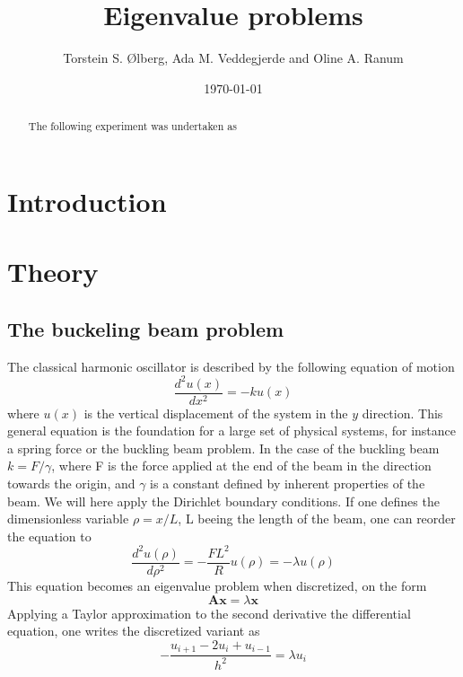 \documentclass[%
reprint,
amsmath,amssymb,
aps,
]{revtex4-1}
\begin{document}
\title{Eigenvalue problems}
\author{Torstein S. Ølberg, Ada M. Veddegjerde and Oline A. Ranum}
\date{\today}


\begin{abstract}
	The following experiment was undertaken as
\end{abstract}
\maketitle

\section*{Introduction}


\section*{Theory}


\subsection{The buckeling beam problem} \noindent 
The classical harmonic oscillator is described by the following equation of motion
\begin{equation}\label{evp}
 \frac{d^2 u(x)}{dx^2} = -k u(x)
\end{equation}
where $u(x)$ is the vertical displacement of the system in the $y$ direction. This general equation is the foundation for a large set of physical systems, for instance a spring force or the buckling beam problem. In the case of the buckling beam $k = F/\gamma$, where F is the force applied at the end of the beam in the direction towards the origin, and $\gamma$ is a constant defined by inherent properties of the beam. We will here apply the Dirichlet boundary conditions. If one defines the dimensionless variable $\rho = x/L$, L beeing the length of the beam, one can reorder the equation to
\begin{equation*}
	 \frac{d^2 u(\rho)}{d\rho^2} = -\frac{FL^2}{R} u(\rho)=-\lambda u(\rho)
\end{equation*}
This equation becomes an eigenvalue problem when discretized, on the form 
\begin{equation*}
\mathbf{A}\mathbf{x} = \lambda\mathbf{x}
\end{equation*}
Applying a Taylor approximation to the second derivative the differential equation, one writes the discretized variant as 
\begin{equation}\label{eqdis}
	-\frac{u_{i+1} -2u_i +u_{i-1} }{h^2}  = \lambda u_i
\end{equation}
\end{document}
